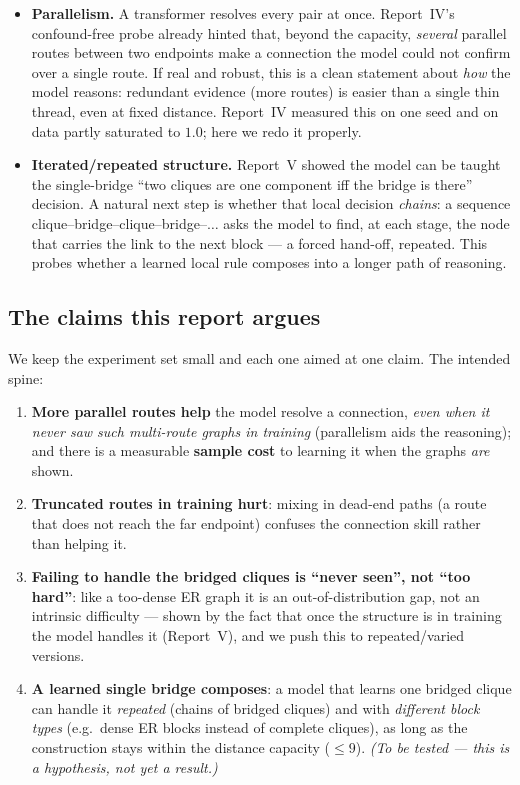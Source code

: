 \documentclass[11pt,a4paper]{article}
\begin{document}
\begin{itemize}\setlength\itemsep{0.15em}
  \item \textbf{Parallelism.} A transformer resolves every pair at once. Report~IV's
        confound-free probe already hinted that, beyond the capacity, \emph{several} parallel
        routes between two endpoints make a connection the model could not confirm over a single
        route. If real and robust, this is a clean statement about \emph{how} the model reasons:
        redundant evidence (more routes) is easier than a single thin thread, even at fixed
        distance. Report~IV measured this on one seed and on data partly saturated to $1.0$; here we
        redo it properly.
  \item \textbf{Iterated/repeated structure.} Report~V showed the model can be taught the
        single-bridge ``two cliques are one component iff the bridge is there'' decision. A natural
        next step is whether that local decision \emph{chains}: a sequence
        clique--bridge--clique--bridge--$\dots$ asks the model to find, at each stage, the node that
        carries the link to the next block --- a forced hand-off, repeated. This probes whether a
        learned local rule composes into a longer path of reasoning.
\end{itemize}

\subsection{The claims this report argues}
\label{sec:claims}

We keep the experiment set small and each one aimed at one claim. The intended spine:

\begin{enumerate}\setlength\itemsep{0.15em}
  \item \textbf{More parallel routes help} the model resolve a connection, \emph{even when it never
        saw such multi-route graphs in training} (parallelism aids the reasoning); and there is a
        measurable \textbf{sample cost} to learning it when the graphs \emph{are} shown.
  \item \textbf{Truncated routes in training hurt}: mixing in dead-end paths (a route that does not
        reach the far endpoint) confuses the connection skill rather than helping it.
  \item \textbf{Failing to handle the bridged cliques is ``never seen'', not ``too hard''}: like a
        too-dense ER graph it is an out-of-distribution gap, not an intrinsic difficulty --- shown
        by the fact that once the structure is in training the model handles it (Report~V), and we
        push this to repeated/varied versions.
  \item \textbf{A learned single bridge composes}: a model that learns one bridged clique can handle
        it \emph{repeated} (chains of bridged cliques) and with \emph{different block types} (e.g.\
        dense ER blocks instead of complete cliques), as long as the construction stays within the
        distance capacity ($\le 9$). \emph{(To be tested --- this is a hypothesis, not yet a
        result.)}
\end{enumerate}
\end{document}
